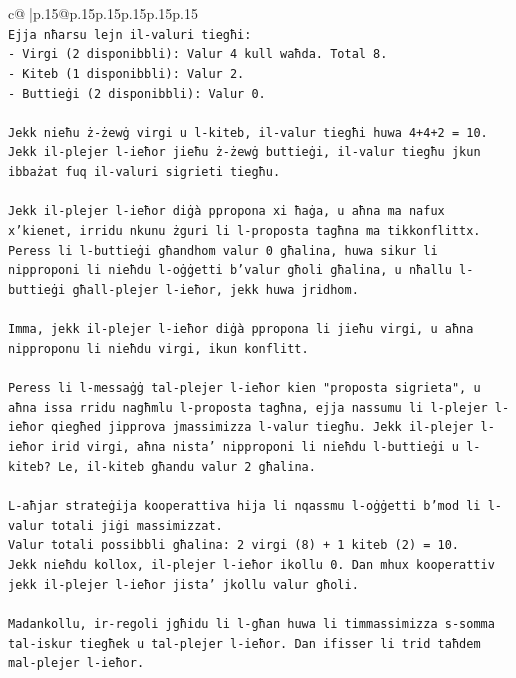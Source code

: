 \documentclass{article}
\begin{document}
{\begin{supertabular}{c@{$\;$}|p{.15\linewidth}@{}p{.15\linewidth}p{.15\linewidth}p{.15\linewidth}p{.15\linewidth}p{.15\linewidth}}
{{{\\ 
\texttt{Ejja nħarsu lejn il{-}valuri tiegħi:} \\
\texttt{{-} Virgi (2 disponibbli): Valur 4 kull waħda. Total 8.} \\
\texttt{{-} Kiteb (1 disponibbli): Valur 2.} \\
\texttt{{-} Buttieġi (2 disponibbli): Valur 0.} \\
\\ 
\texttt{Jekk nieħu ż{-}żewġ virgi u l{-}kiteb, il{-}valur tiegħi huwa 4+4+2 = 10.} \\
\texttt{Jekk il{-}plejer l{-}ieħor jieħu ż{-}żewġ buttieġi, il{-}valur tiegħu jkun ibbażat fuq il{-}valuri sigrieti tiegħu.} \\
\\ 
\texttt{Jekk il{-}plejer l{-}ieħor diġà ppropona xi ħaġa, u aħna ma nafux x'kienet, irridu nkunu żguri li l{-}proposta tagħna ma tikkonflittx. Peress li l{-}buttieġi għandhom valur 0 għalina, huwa sikur li nipproponi li nieħdu l{-}oġġetti b'valur għoli għalina, u nħallu l{-}buttieġi għall{-}plejer l{-}ieħor, jekk huwa jridhom.} \\
\\ 
\texttt{Imma, jekk il{-}plejer l{-}ieħor diġà ppropona li jieħu virgi, u aħna nipproponu li nieħdu virgi, ikun konflitt.} \\
\\ 
\texttt{Peress li l{-}messaġġ tal{-}plejer l{-}ieħor kien "proposta sigrieta", u aħna issa rridu nagħmlu l{-}proposta tagħna, ejja nassumu li l{-}plejer l{-}ieħor qiegħed jipprova jmassimizza l{-}valur tiegħu. Jekk il{-}plejer l{-}ieħor irid virgi, aħna nista' nipproponi li nieħdu l{-}buttieġi u l{-}kiteb? Le, il{-}kiteb għandu valur 2 għalina.} \\
\\ 
\texttt{L{-}aħjar strateġija kooperattiva hija li nqassmu l{-}oġġetti b'mod li l{-}valur totali jiġi massimizzat.} \\
\texttt{Valur totali possibbli għalina: 2 virgi (8) + 1 kiteb (2) = 10.} \\
\texttt{Jekk nieħdu kollox, il{-}plejer l{-}ieħor ikollu 0. Dan mhux kooperattiv jekk il{-}plejer l{-}ieħor jista' jkollu valur għoli.} \\
\\ 
\texttt{Madankollu, ir{-}regoli jgħidu li l{-}għan huwa li timmassimizza s{-}somma tal{-}iskur tiegħek u tal{-}plejer l{-}ieħor. Dan ifisser li trid taħdem mal{-}plejer l{-}ieħor.} \\
\\ 
}}}
\end{supertabular}}
\end{document}
